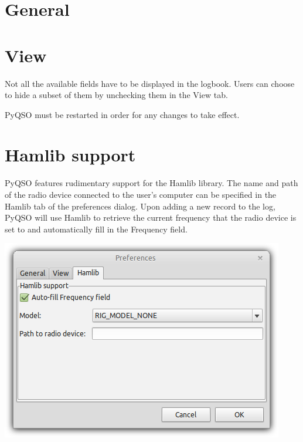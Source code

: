 \documentclass[11pt, a4paper]{report}
\begin{document}
\section{General}


\section{View}
Not all the available fields have to be displayed in the logbook. Users can choose to hide a subset of them by unchecking them in the View tab. 

PyQSO must be restarted in order for any changes to take effect.

\section{Hamlib support}
PyQSO features rudimentary support for the Hamlib library. The name and path of the radio device connected to the user's computer can be specified in the Hamlib tab of the preferences dialog. Upon adding a new record to the log, PyQSO will use Hamlib to retrieve the current frequency that the radio device is set to and automatically fill in the Frequency field. 

\begin{center}
  \includegraphics[width=1\columnwidth]{images/preferences_hamlib.png}
\end{center}


\end{document}
